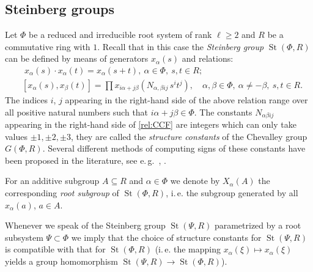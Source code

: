 \documentclass[oneside, 8pt]{amsart}
\theoremstyle{remark}
\theoremstyle{definition}
\numberwithin{lemma}{section}
\numberwithin{prop}{section}
\numberwithin{corollary}{section}
\numberwithin{externaltheorem}{section}
\DeclareMathOperator{\St}{St}
\numberwithin{equation}{section}
\begin{document}
\subsection{Steinberg groups} \label{sec:Steinberg-intro}
Let $\Phi$ be a reduced and irreducible root system of rank $\ell \geq 2$ and $R$ be a commutative ring with $1$. Recall that in this case the \emph{Steinberg group} $\St(\Phi, R)$ can be defined by means of generators $x_{\alpha}(s)$ and relations:
\begin{align}
& \phantom{[}
x_\alpha(s) \cdot x_\alpha(t) = x_\alpha(s+t),\ \alpha\in\Phi,\ s,t\in R; \label{rel:add}\\
& [x_\alpha(s), x_\beta(t)] = \prod
 x_{i\alpha + j\beta}\left(N_{\alpha,\beta ij}\, s^i t^j\right),\quad \alpha,\beta\in\Phi,\ \alpha\neq-\beta,\ s,t\in R. \label{rel:CCF}
\end{align}
The indices $i$, $j$ appearing in the right-hand side of the above relation range over
all positive natural numbers such that $i\alpha + j\beta\in\Phi$.
The constants $N_{\alpha \beta i j}$ appearing in the right-hand side of \eqref{rel:CCF} are integers which can only take values $\pm 1,\pm 2,\pm 3$, they are called the {\it structure constants} of the Chevalley group $G(\Phi, R)$. Several different methods of computing signs of these constants have been proposed in the literature, see e.\,g.~\cite{V00}, \cite[\S~9]{VP}. 

For an additive subgroup $A\subseteq R$ and $\alpha \in \Phi$ we denote by $X_\alpha(A)$ the corresponding {\it root subgroup} of $\St(\Phi, R)$, i.\,e. the subgroup generated by all $x_\alpha(a)$, $a \in A$.

Whenever we speak of the Steinberg group $\St(\Psi, R)$ parametrized by a root subsystem $\Psi \subset \Phi$ we imply that the choice of structure constants 
 for $\St(\Psi, R)$ is compatible with that for $\St(\Phi, R)$ (i.\,e. the mapping $x_\alpha(\xi) \mapsto x_\alpha(\xi)$ yields a group homomorphism $\St(\Psi, R) \to \St(\Phi, R)$).
\end{document}
